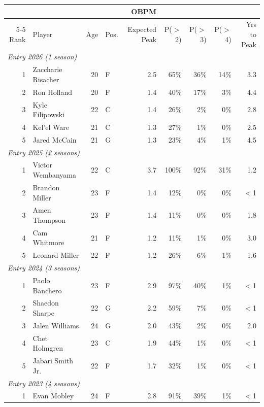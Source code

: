 \begin{table}[htbp]
  \centering\small
  \begin{tabular}{rlrlrrrrr}
    \toprule
     & & & & OBPM & & & & \\
    \cmidrule(lr){5-5}
    Rank & Player & Age & Pos. & Expected Peak & P($>$2) & P($>$3) & P($>$4) & Yrs to Peak \\
    \midrule
    \multicolumn{9}{l}{\textit{Entry 2026 (1 season)}} \\
    \midrule
    1 & Zaccharie Risacher & 20 & F & 2.5 & 65\% & 36\% & 14\% & 3.3 \\
    2 & Ron Holland & 20 & F & 1.4 & 40\% & 17\% & 3\% & 4.4 \\
    3 & Kyle Filipowski & 22 & C & 1.4 & 26\% & 2\% & 0\% & 2.8 \\
    4 & Kel'el Ware & 21 & C & 1.3 & 27\% & 1\% & 0\% & 2.5 \\
    5 & Jared McCain & 21 & G & 1.3 & 23\% & 4\% & 1\% & 4.5 \\
    \midrule[0.4pt]
    \multicolumn{9}{l}{\textit{Entry 2025 (2 seasons)}} \\
    \midrule
    1 & Victor Wembanyama & 22 & C & 3.7 & 100\% & 92\% & 31\% & 1.2 \\
    2 & Brandon Miller & 23 & F & 1.4 & 12\% & 0\% & 0\% & $<$1 \\
    3 & Amen Thompson & 23 & F & 1.4 & 11\% & 0\% & 0\% & 1.8 \\
    4 & Cam Whitmore & 21 & F & 1.2 & 11\% & 1\% & 0\% & 3.0 \\
    5 & Leonard Miller & 22 & F & 1.2 & 26\% & 6\% & 1\% & 1.6 \\
    \midrule[0.4pt]
    \multicolumn{9}{l}{\textit{Entry 2024 (3 seasons)}} \\
    \midrule
    1 & Paolo Banchero & 23 & F & 2.9 & 97\% & 40\% & 1\% & $<$1 \\
    2 & Shaedon Sharpe & 22 & G & 2.2 & 59\% & 7\% & 0\% & $<$1 \\
    3 & Jalen Williams & 24 & G & 2.0 & 43\% & 2\% & 0\% & 2.0 \\
    4 & Chet Holmgren & 23 & C & 1.9 & 44\% & 1\% & 0\% & $<$1 \\
    5 & Jabari Smith Jr. & 22 & F & 1.7 & 32\% & 1\% & 0\% & $<$1 \\
    \midrule[0.4pt]
    \multicolumn{9}{l}{\textit{Entry 2023 (4 seasons)}} \\
    \midrule
    1 & Evan Mobley & 24 & F & 2.8 & 91\% & 39\% & 1\% & $<$1 \\

\end{tabular}
\end{table}
